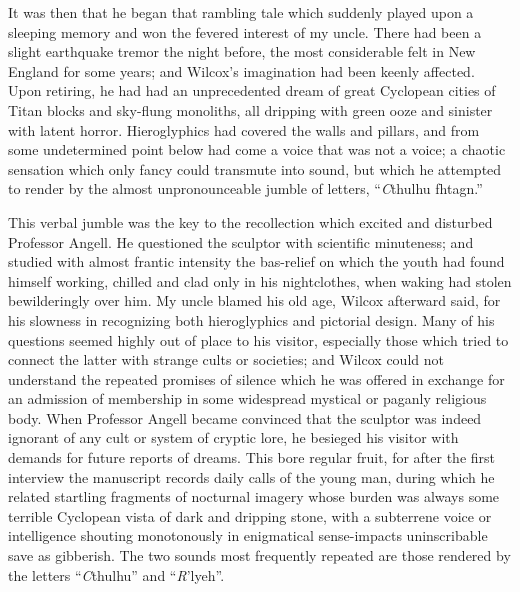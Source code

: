 It was then that he began that rambling tale which suddenly played upon a sleeping memory and won the fevered interest of my uncle. There had been a slight earthquake tremor the night before, the most considerable felt in New England for some years; and Wilcox’s imagination had been keenly affected. Upon retiring, he had had an unprecedented dream of great Cyclopean cities of Titan blocks and sky-flung monoliths, all dripping with green ooze and sinister with latent horror. Hieroglyphics had covered the walls and pillars, and from some undetermined point below had come a voice that was not a voice; a chaotic sensation which only fancy could transmute into sound, but which he attempted to render by the almost unpronounceable jumble of letters, “{\emph Cthulhu fhtagn.}”

This verbal jumble was the key to the recollection which excited and disturbed Professor Angell. He questioned the sculptor with scientific minuteness; and studied with almost frantic intensity the bas-relief on which the youth had found himself working, chilled and clad only in his nightclothes, when waking had stolen bewilderingly over him. My uncle blamed his old age, Wilcox afterward said, for his slowness in recognizing both hieroglyphics and pictorial design. Many of his questions seemed highly out of place to his visitor, especially those which tried to connect the latter with strange cults or societies; and Wilcox could not understand the repeated promises of silence which he was offered in exchange for an admission of membership in some widespread mystical or paganly religious body. When Professor Angell became convinced that the sculptor was indeed ignorant of any cult or system of cryptic lore, he besieged his visitor with demands for future reports of dreams. This bore regular fruit, for after the first interview the manuscript records daily calls of the young man, during which he related startling fragments of nocturnal imagery whose burden was always some terrible Cyclopean vista of dark and dripping stone, with a subterrene voice or intelligence shouting monotonously in enigmatical sense-impacts uninscribable save as gibberish. The two sounds most frequently repeated are those rendered by the letters “{\emph Cthulhu}” and “{\emph R’lyeh}”.


